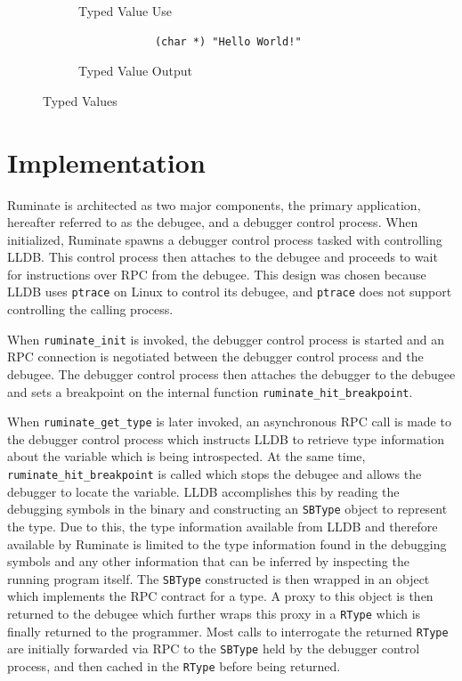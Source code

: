 \documentclass{report}
\begin{document}
\begin{figure}
	\begin{subfigure}{\linewidth}
		\inputminted[tabsize=2]{c}{memory.c}
		\caption{Typed Value Use}
		\label{fig:typed_values_code}
	\end{subfigure}
	\begin{subfigure}{\linewidth}
		\begin{verbatim}
			(char *) "Hello World!"
		\end{verbatim}
		\caption{Typed Value Output}
		\label{fig:typed_values_output}
	\end{subfigure}
	\caption{Typed Values}
	\label{fig:typed_values}
\end{figure}

\section{Implementation}
\label{sec:implementation}
Ruminate is architected as two major components, the primary application,
hereafter referred to as the debugee, and a debugger control process. When
initialized, Ruminate spawns a debugger control process tasked with controlling
LLDB. This control process then attaches to the debugee and proceeds to wait for
instructions over RPC from the debugee. This design was chosen because LLDB uses
\lstinline|ptrace| on Linux to control its debugee, and \lstinline|ptrace| does
not support controlling the calling process.

When \lstinline|ruminate_init| is invoked, the debugger control process is
started and an RPC connection is negotiated between the debugger control process
and the debugee. The debugger control process then attaches the debugger to the
debugee and sets a breakpoint on the internal function
\lstinline|ruminate_hit_breakpoint|.

When \lstinline|ruminate_get_type| is later invoked, an asynchronous RPC call is
made to the debugger control process which instructs LLDB to retrieve type
information about the variable which is being introspected. At the same time,
\lstinline|ruminate_hit_breakpoint| is called which stops the debugee and allows
the debugger to locate the variable. LLDB accomplishes this by reading the
debugging symbols in the binary and constructing an \lstinline|SBType|
\autocite{sbtype} object to represent the type. Due to this, the type
information available from LLDB and therefore available by Ruminate is limited
to the type information found in the debugging symbols and any other information
that can be inferred by inspecting the running program itself. The
\lstinline|SBType| constructed is then wrapped in an object which implements the
RPC contract for a type. A proxy to this object is then returned to the debugee
which further wraps this proxy in a \lstinline|RType| which is finally returned
to the programmer. Most calls to interrogate the returned \lstinline|RType| are
initially forwarded via RPC to the \lstinline|SBType| held by the debugger
control process, and then cached in the \lstinline|RType| before being returned.
\end{document}
